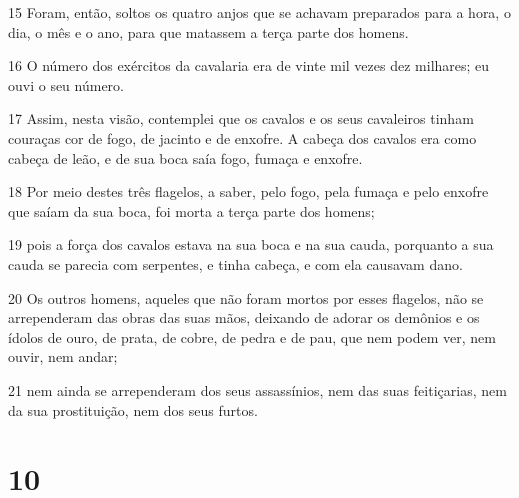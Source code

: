 \par 15 Foram, então, soltos os quatro anjos que se achavam preparados para a hora, o dia, o mês e o ano, para que matassem a terça parte dos homens.
\par 16 O número dos exércitos da cavalaria era de vinte mil vezes dez milhares; eu ouvi o seu número.
\par 17 Assim, nesta visão, contemplei que os cavalos e os seus cavaleiros tinham couraças cor de fogo, de jacinto e de enxofre. A cabeça dos cavalos era como cabeça de leão, e de sua boca saía fogo, fumaça e enxofre.
\par 18 Por meio destes três flagelos, a saber, pelo fogo, pela fumaça e pelo enxofre que saíam da sua boca, foi morta a terça parte dos homens;
\par 19 pois a força dos cavalos estava na sua boca e na sua cauda, porquanto a sua cauda se parecia com serpentes, e tinha cabeça, e com ela causavam dano.
\par 20 Os outros homens, aqueles que não foram mortos por esses flagelos, não se arrependeram das obras das suas mãos, deixando de adorar os demônios e os ídolos de ouro, de prata, de cobre, de pedra e de pau, que nem podem ver, nem ouvir, nem andar;
\par 21 nem ainda se arrependeram dos seus assassínios, nem das suas feitiçarias, nem da sua prostituição, nem dos seus furtos.

\chapter{10}

